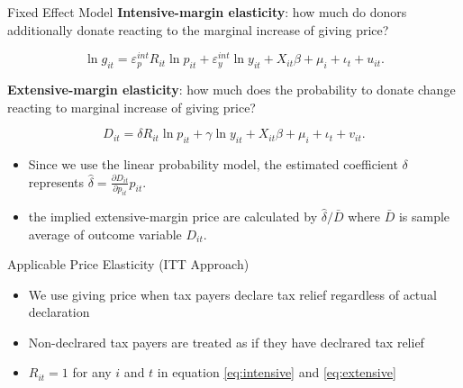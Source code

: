 \documentclass[
  ignorenonframetext,
  aspectratio=169,
]{beamer}
\providecommand{\tightlist}{%
  \setlength{\itemsep}{0pt}\setlength{\parskip}{0pt}}
\begin{document}
\begin{frame}{Fixed Effect Model}
\protect\hypertarget{fixed-effect-model}{}
\textbf{Intensive-margin elasticity}: how much do donors additionally donate reacting to the marginal increase of giving price?

\begin{equation}
    \ln g_{it} = \varepsilon^{int}_p R_{it} \ln p_{it} + \varepsilon^{int}_y \ln y_{it} 
    + X_{it}\beta +\mu_i +\iota_t +u_{it}. \label{eq:intensive}
\end{equation}

\textbf{Extensive-margin elasticity}: how much does the probability to donate change reacting to marginal increase of giving price?

\begin{equation}
D_{it} =  \delta R_{it} \ln p_{it} +\gamma \ln y_{it} + X_{it}\beta +\mu_i  +\iota_t +v_{it}. \label{eq:extensive}
\end{equation}

\begin{itemize}
\tightlist
\item
  Since we use the linear probability model, the estimated coefficient \(\delta\) represents \(\hat{\delta} = \frac{\partial D_{it}}{\partial p_{it}} p_{it}\).
\item
  the implied extensive-margin price are calculated by \(\hat{\delta}/\bar{D}\) where \(\bar{D}\) is sample average of outcome variable \(D_{it}\).
\end{itemize}
\end{frame}

\begin{frame}{Applicable Price Elasticity (ITT Approach)}
\protect\hypertarget{applicable-price-elasticity-itt-approach}{}
\begin{itemize}
\tightlist
\item
  We use giving price when tax payers declare tax relief regardless of actual declaration
\item
  Non-declrared tax payers are treated as if they have declrared tax relief
\item
  \(R_{it} = 1\) for any \(i\) and \(t\) in equation \eqref{eq:intensive} and \eqref{eq:extensive}
\end{itemize}
\end{frame}
\end{document}
